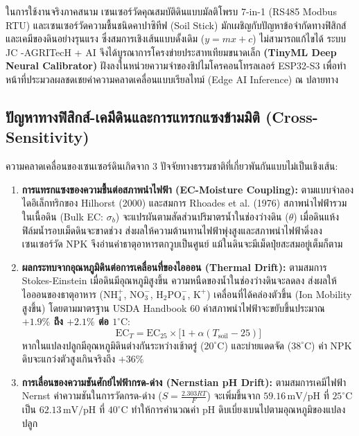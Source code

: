 ในการใช้งานจริงภาคสนาม เซนเซอร์วัดคุณสมบัติดินแบบมัลติโพรบ 7-in-1 (RS485 Modbus RTU) และเซนเซอร์วัดความชื้นชนิดคาปาซิทีฟ (Soil Stick) มักเผชิญกับปัญหาข้อจำกัดทางฟิสิกส์และเคมีของดินอย่างรุนแรง ซึ่งสมการเชิงเส้นแบบดั้งเดิม ($y = mx + c$) ไม่สามารถแก้ไขได้ ระบบ JC -AGRITecH + AI จึงได้บูรณาการโครงข่ายประสาทเทียมขนาดเล็ก \textbf{(TinyML Deep Neural Calibrator)} ฝังลงในหน่วยความจำของชิปไมโครคอนโทรลเลอร์ ESP32-S3 เพื่อทำหน้าที่ประมวลผลชดเชยค่าความคลาดเคลื่อนแบบเรียลไทม์ (Edge AI Inference) ณ ปลายทาง

\subsection{ปัญหาทางฟิสิกส์-เคมีดินและการแทรกแซงข้ามมิติ (Cross-Sensitivity)}

ความคลาดเคลื่อนของเซนเซอร์ดินเกิดจาก 3 ปัจจัยทางธรรมชาติที่เกี่ยวพันกันแบบไม่เป็นเชิงเส้น:

\begin{enumerate}
    \item \textbf{การแทรกแซงของความชื้นต่อสภาพนำไฟฟ้า (EC-Moisture Coupling):} 
    ตามแบบจำลองไดอิเล็กทริกของ Hilhorst (2000) และสมการ Rhoades et al. (1976) สภาพนำไฟฟ้ารวมในเนื้อดิน (Bulk EC: $\sigma_b$) จะแปรผันตามสัดส่วนปริมาตรน้ำในช่องว่างดิน ($\theta$) เมื่อดินแห้ง ฟิล์มน้ำรอบเม็ดดินจะขาดช่วง ส่งผลให้ความต้านทานไฟฟ้าพุ่งสูงและสภาพนำไฟฟ้าดิ่งลง เซนเซอร์วัด NPK จึงอ่านค่าธาตุอาหารตกวูบเป็นศูนย์ แม้ในดินจะมีเม็ดปุ๋ยสะสมอยู่เต็มก็ตาม
    
    \item \textbf{ผลกระทบจากอุณหภูมิดินต่อการเคลื่อนที่ของไอออน (Thermal Drift):}
    ตามสมการ Stokes-Einstein เมื่อดินมีอุณหภูมิสูงขึ้น ความหนืดของน้ำในช่องว่างดินจะลดลง ส่งผลให้ไอออนของธาตุอาหาร ($\text{NH}_4^+$, $\text{NO}_3^-$, $\text{H}_2\text{PO}_4^-$, $\text{K}^+$) เคลื่อนที่ได้คล่องตัวขึ้น (Ion Mobility สูงขึ้น) โดยตามมาตรฐาน USDA Handbook 60 ค่าสภาพนำไฟฟ้าจะขยับขึ้นประมาณ \textbf{$+1.9\%$ ถึง $+2.1\%$ ต่อ $1^\circ\text{C}$}:
    \begin{equation}
        \text{EC}_{T} = \text{EC}_{25} \times \Big[ 1 + \alpha(T_{\text{soil}} - 25) \Big]
        \label{eq:thermal_drift}
    \end{equation}
    หากในแปลงปลูกมีอุณหภูมิดินต่างกันระหว่างเช้าตรู่ ($20^\circ\text{C}$) และบ่ายแดดจัด ($38^\circ\text{C}$) ค่า NPK ดิบจะแกว่งตัวสูงเกินจริงถึง $+36\%$
    
    \item \textbf{การเลื่อนของความชันศักย์ไฟฟ้ากรด-ด่าง (Nernstian pH Drift):}
    ตามสมการเคมีไฟฟ้า Nernst ค่าความชันในการวัดกรด-ด่าง ($S = \frac{2.303 RT}{F}$) จะเพิ่มขึ้นจาก $59.16\,\text{mV/pH}$ ที่ $25^\circ\text{C}$ เป็น $62.13\,\text{mV/pH}$ ที่ $40^\circ\text{C}$ ทำให้การคำนวณค่า pH ดิบเบี่ยงเบนไปตามอุณหภูมิของแปลงปลูก
\end{enumerate}

